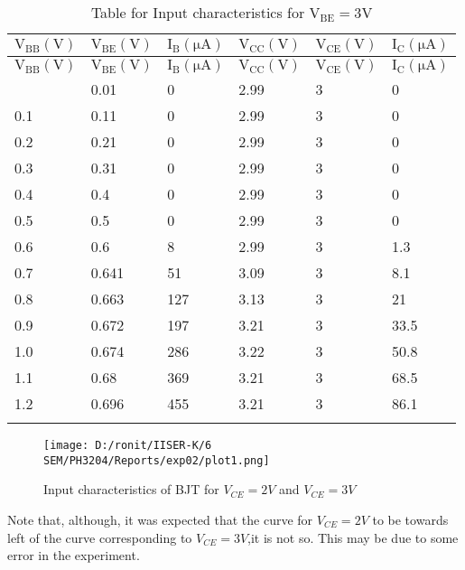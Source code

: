 \documentclass[12pt]{article}
\begin{document}
\begin{longtable}{|l|l|l|l|l|l|}
	\hline
    $\mathrm{V_{BB}(V)}$ & $\mathrm{V_{BE}(V)}$ & $\mathrm{I_{B}(\mu A)}$  & $\mathrm{V_{CC}(V)}$  & $\mathrm{V_{CE}(V)}$ & $\mathrm{I_{C}(\mu A)}$  \\ \hline
	\endfirsthead
	\hline
    $\mathrm{V_{BB}(V)}$ & $\mathrm{V_{BE}(V)}$ & $\mathrm{I_{B}(\mu A)}$  & $\mathrm{V_{CC}(V)}$  & $\mathrm{V_{CE}(V)}$ & $\mathrm{I_{C}(\mu A)}$  \\ \hline
	\endhead
	\hline
	\endfoot
	
	\endlastfoot
    0.01 & 0.01  & 0   & 2.99  & 3  & 0   \\ \hline
    0.1  & 0.11  & 0   & 2.99  & 3  & 0   \\ \hline
    0.2  & 0.21  & 0   & 2.99  & 3  & 0   \\ \hline
    0.3  & 0.31  & 0   & 2.99  & 3  & 0   \\ \hline
    0.4  & 0.4   & 0   & 2.99  & 3  & 0   \\ \hline
    0.5  & 0.5   & 0   & 2.99  & 3  & 0   \\ \hline
    0.6  & 0.6   & 8   & 2.99  & 3  & 1.3 \\ \hline
    0.7  & 0.641 & 51  & 3.09  & 3  & 8.1 \\ \hline
    0.8  & 0.663 & 127 & 3.13  & 3  & 21  \\ \hline
    0.9  & 0.672 & 197 & 3.21  & 3  & 33.5 \\ \hline
    1.0  & 0.674 & 286 & 3.22  & 3  & 50.8 \\ \hline
    1.1  & 0.68  & 369 & 3.21  & 3  & 68.5 \\ \hline
    1.2  & 0.696 & 455 & 3.21  & 3  & 86.1 \\ \hline
\caption{Table for Input characteristics for $\mathrm{V_{BE}=3V}$}
\label{tab:part01_02}
\end{longtable}\noindent
\begin{figure}[H]  
    \centering  
    \texttt{[image: D:/ronit/IISER-K/6 SEM/PH3204/Reports/exp02/plot1.png]}  %
    \caption{Input characteristics of BJT for $V_{CE}=2V$ and $V_{CE}=3V$}  %
    \label{fig:part01_01}  %
  \end{figure}\noindent
  Note that, although, it was expected that the curve for $V_{CE}=2V$ to be towards left of the curve corresponding to $V_{CE}=3V$,it is not so. This may be due to some error in the experiment.\\
\end{document}

